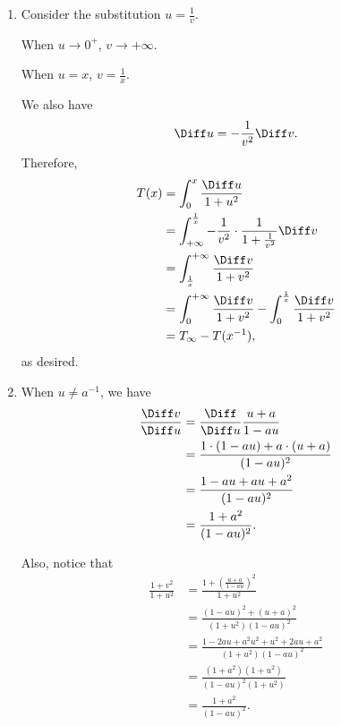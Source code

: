 \Question{\currfilebase}

\begin{enumerate}
    \item Consider the substitution \(u = \frac{1}{v}\).

          When \(u \to 0^{+}\), \(v \to +\infty\).

          When \(u = x\), \(v = \frac{1}{x}\).

          We also have
          \[
              \Diff u = - \frac{1}{v^2} \Diff v.
          \]
          Therefore,
          \begin{align*}
              T(x) & = \int_0^x \frac{\Diff u}{1 + u^2}                                                            \\
                   & = \int_{+\infty}^{\frac{1}{x}} -\frac{1}{v^2} \cdot \frac{1}{1 + \frac{1}{v^2}} \Diff v       \\
                   & = \int_{\frac{1}{x}}^{+\infty} \frac{\Diff v}{1 + v^2}                                        \\
                   & = \int_{0}^{+\infty} \frac{\Diff v}{1 + v^2} - \int_{0}^{\frac{1}{x}} \frac{\Diff v}{1 + v^2} \\
                   & = T_{\infty} - T(x^{-1}),
          \end{align*}
          as desired.

    \item When \(u \neq a^{-1}\), we have
          \begin{align*}
              \frac{\Diff v}{\Diff u} & = \frac{\Diff}{\Diff u} \frac{u+a}{1-au}          \\
                                      & = \frac{1 \cdot (1-au) + a \cdot (u+a)}{(1-au)^2} \\
                                      & = \frac{1 - au + au + a^2}{(1-au)^2}              \\
                                      & = \frac{1 + a^2}{(1-au)^2}.
          \end{align*}

          Also, notice that
          \begin{align*}
              \frac{1 + v^2}{1 + u^2} & = \frac{1 + \left(\frac{u + a}{1 - au}\right)^2}{1 + u^2}     \\
                                      & = \frac{(1-au)^2 + (u+a)^2}{(1+u^2) (1-au)^2}                 \\
                                      & = \frac{1 - 2au + a^2u^2 + u^2 + 2au + a^2}{(1+u^2) (1-au)^2} \\
                                      & = \frac{(1 + a^2) (1 + u^2)}{(1 - au)^2 (1 + u^2)}            \\
                                      & = \frac{1 + a^2}{(1 - au)^2}.
          \end{align*}


\end{enumerate}
